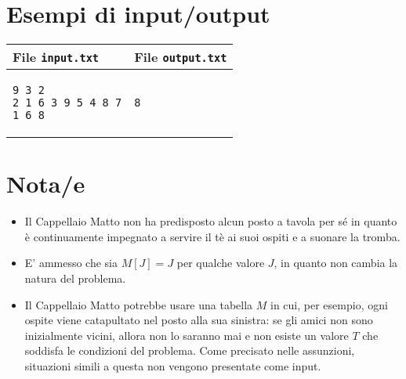\documentclass[a4paper,11pt]{article}
\begin{document}
\section*{Esempi di input/output}

  
    \noindent
    \begin{tabular}{p{11cm}|p{5cm}}
    \toprule
    \textbf{File \texttt{input.txt}}
    & \textbf{File \texttt{output.txt}}
    \\
    \midrule
    \scriptsize
    \begin{verbatim}
9 3 2
2 1 6 3 9 5 4 8 7
1 6 8
\end{verbatim}
    &
    \scriptsize
    \begin{verbatim}
8
\end{verbatim}
    \\
    \bottomrule
    \end{tabular}
  
\section*{Nota/e}
\begin{itemize}
  
    \item  
Il Cappellaio Matto non ha predisposto alcun posto a tavola per
sé in quanto è continuamente impegnato a servire il
tè ai suoi ospiti e a suonare la tromba.

    \item  E' ammesso che sia $M[J] = J$ per
  qualche valore $J$, in quanto non cambia la natura del problema.

    \item  Il Cappellaio Matto potrebbe usare una tabella $M$ in
cui, per esempio, ogni ospite viene catapultato nel posto alla sua
sinistra: se gli amici non sono inizialmente vicini, allora non lo
saranno mai e non esiste un valore $T$ che soddisfa le
condizioni del problema.  Come precisato nelle assunzioni, situazioni
simili a questa non vengono presentate come input.

\end{itemize}
\end{document}
